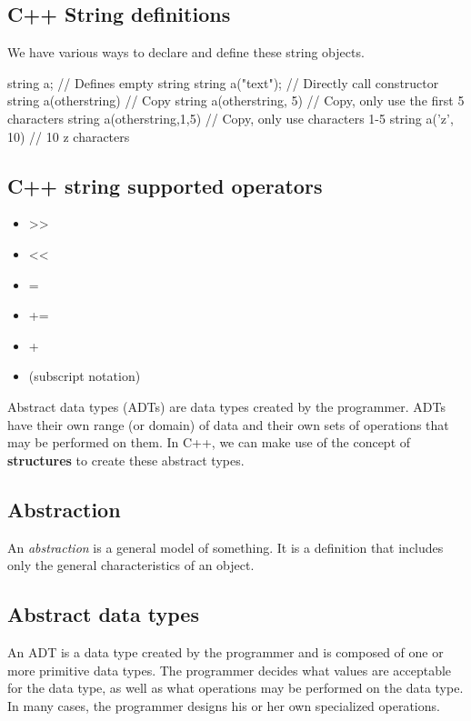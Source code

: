 \documentclass{report}
\begin{document}
    \bigbreak \noindent 
    \subsection{C++ String definitions}
    \bigbreak \noindent 
    We have various ways to declare and define these string objects.
    \bigbreak \noindent 
    
    \begin{cppcode}
string a; // Defines empty string
string a("text"); // Directly call constructor
string a(otherstring) // Copy
string a(otherstring, 5) // Copy, only use the first 5 characters
string a(otherstring,1,5) // Copy, only use characters 1-5
string a('z', 10) // 10 z characters
    \end{cppcode}
    

    \bigbreak \noindent 
    \subsection{C++ string supported operators}
    \bigbreak \noindent 
    \begin{itemize}
        \item >>
        \item <<
        \item =
        \item +=
        \item +
        \item [] (subscript notation)
    \end{itemize}

    \pagebreak
    \bigbreak \noindent 
    \begin{concept}
        Abstract data types (ADTs) are data types created by the programmer. ADTs have their own range (or domain) of data and their own sets of operations that may be performed on them. In C++, we can make use of the concept of \textbf{structures} to create these abstract types. 
	\end{concept}

	\bigbreak \noindent 
	\subsection{Abstraction}
	\bigbreak \noindent 
	An \textit{abstraction} is a general model  of something. It is a definition that includes only the general characteristics of an object.

	\bigbreak \noindent 
	\subsection{Abstract data types}
	\bigbreak \noindent 
	An ADT is a data type created by the programmer and is composed of one or more primitive data types. The programmer decides what values are acceptable for the data type, as well as what operations may be performed on the data type. In many cases, the programmer designs his or her own specialized operations.
\end{document}
